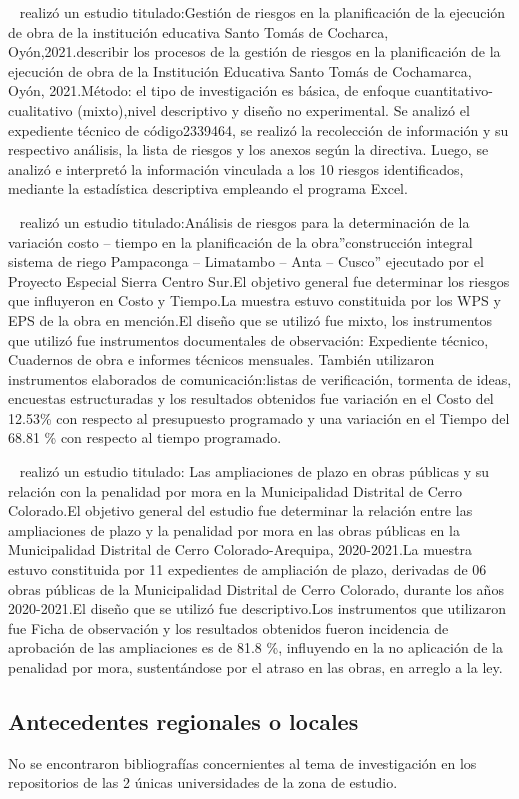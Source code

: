 ~\cite{FigueroaVillarreal2022} realizó un estudio titulado:Gestión de riesgos en la planificación de la ejecución de obra de la institución educativa Santo Tomás de Cocharca, Oyón,2021.describir los procesos de la gestión de riesgos en la planificación de la ejecución de obra de la Institución Educativa Santo Tomás de Cochamarca, Oyón, 2021.Método: el tipo de investigación es básica, de enfoque cuantitativo-cualitativo (mixto),nivel descriptivo y diseño no experimental. Se analizó el expediente técnico de código2339464, se realizó la recolección de información y su respectivo análisis, la lista de riesgos y los anexos según la directiva. Luego, se analizó e interpretó la información vinculada a los 10 riesgos identificados, mediante la estadística descriptiva empleando el programa Excel.

~\cite{MachadoYnquillay2021} realizó un estudio titulado:Análisis de riesgos para la determinación de la variación costo – tiempo en la planificación de la obra''construcción integral sistema de riego Pampaconga – Limatambo – Anta – Cusco'' ejecutado por el Proyecto Especial Sierra Centro Sur.El objetivo general fue determinar los riesgos que influyeron en Costo y Tiempo.La muestra estuvo constituida por los WPS y EPS de la obra en mención.El diseño que se utilizó fue mixto, los instrumentos que utilizó fue instrumentos documentales de observación: Expediente técnico, Cuadernos de obra e informes técnicos mensuales. También utilizaron instrumentos elaborados de comunicación:listas de verificación, tormenta de ideas, encuestas estructuradas y los resultados obtenidos fue variación en el Costo del 12.53\% con respecto al presupuesto programado y una variación en el Tiempo del 68.81 \% con respecto al tiempo programado.

~\cite{FontanaBecerra2022} realizó un estudio titulado: Las ampliaciones de plazo en obras públicas y su relación con la penalidad por mora en la Municipalidad Distrital de Cerro Colorado.El objetivo general del estudio fue determinar la relación entre las ampliaciones de plazo y la penalidad por mora en las obras públicas en la Municipalidad Distrital de Cerro Colorado-Arequipa, 2020-2021.La muestra estuvo constituida por  11 expedientes de ampliación de plazo, derivadas de 06 obras públicas de la Municipalidad Distrital de Cerro Colorado, durante los años 2020-2021.El diseño que se utilizó fue descriptivo.Los instrumentos que utilizaron fue Ficha de observación y los resultados obtenidos fueron incidencia de aprobación de las ampliaciones es de 81.8 \%, influyendo en la no aplicación de la penalidad por mora, sustentándose por el atraso en las obras, en arreglo a la ley.

\subsection{Antecedentes regionales o locales}

No se encontraron bibliografías concernientes al tema de investigación en los repositorios de las 2 únicas universidades de la zona de estudio.